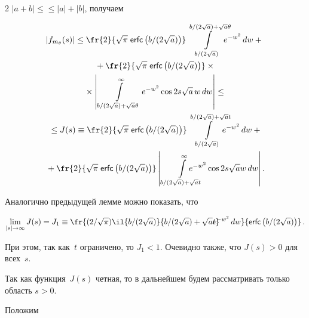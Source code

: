 \begin{multicols}{2}
$|a + b| \leq$\linebreak $\leq |a| + |b|$, получаем


\begin{multline*}


\!|f_{m_{\theta}}(s)| \leq \fr{2}{\sqrt{\pi}\;{\sf erfc}\left(b/(2\sqrt{a})\right)} 


\int\limits_{{b}/({2\sqrt{a}})}^{{b}/({2\sqrt{a}}) + 


\sqrt{a}\theta}\!\!\!\!\! e^{-w^2}\,dw +{}\\


{}+ \fr{2}{\sqrt{\pi}\;{\sf erfc}\left(b/(2\sqrt{a})\right)}\times{}\\


{}\times \left|\,\int\limits_{{b}/({2\sqrt{a}}) + \sqrt{a}\theta}^{\infty} e^{-w^2} \cos 2s\sqrt{a}\, 


w\,dw\right| \leq{}\\


{}


\leq J(s) \equiv \fr{2}{\sqrt{\pi}\;{\sf erfc}\left(b/(2\sqrt{a})\right)} \int\limits_{{b}/({2\sqrt{a}})}^{{b}/({2\sqrt{a}}) + 


\sqrt{a}t} \!\!\!\!\!\!e^{-w^2}\,dw +{}\\


{}+ \fr{2}{\sqrt{\pi}\;{\sf erfc}\left(b/(2\sqrt{a})\right)}


\left|\,\int\limits_{{b}/({2\sqrt{a}}) + \sqrt{a}t}^{\infty}\!\!\!\!\!\!\!\!\!\!\! e^{-w^2} \cos 2s\sqrt{a} w\,dw\right|.


\end{multline*}


Аналогично предыдущей лемме можно показать, что


$$


\lim\limits_{|s|\to\infty} J(s) = J_1 \equiv 


\fr{({2}/{\sqrt{\pi}})\il{{b}/({2\sqrt{a}})}{{b}/({2\sqrt{a}})+\sqrt{a}t}


\!\!\!\!\!e^{-w^2}\,dw}{{\sf erfc}\left(b/(2\sqrt{a})\right)}\,.


$$


При этом, так как~$t$ ограничено, то $J_1<1$. Очевидно также, что $J(s)>0$ для всех~$s$. 


Так как функция~$J(s)$ четная, то в дальнейшем будем рассматривать только область $s > 0$.





Положим


$$



\end{multicols}
